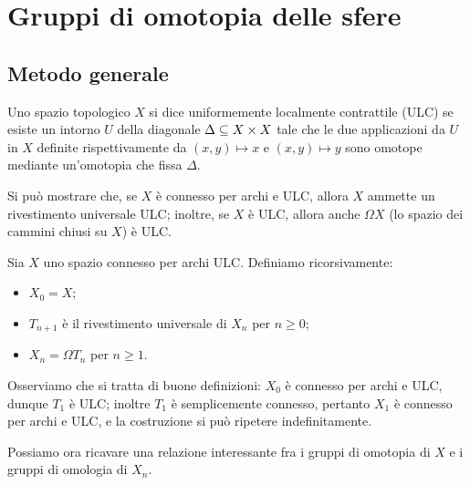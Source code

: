 \chapter{Gruppi di omotopia delle sfere}

\section{Metodo generale}

\begin{definition}
Uno spazio topologico $X$ si dice uniformemente localmente contrattile (ULC) se esiste un intorno $U$ della diagonale $\Delta\subseteq X\times X$ tale che le due applicazioni da $U$ in $X$ definite rispettivamente da $(x,y)\mapsto x$ e $(x,y)\mapsto y$ sono omotope mediante un'omotopia che fissa $\Delta$.
\end{definition}

Si può mostrare che, se $X$ è connesso per archi e ULC, allora $X$ ammette un rivestimento universale ULC; inoltre, se $X$ è ULC, allora anche $\Omega X$ (lo spazio dei cammini chiusi su $X$) è ULC.

Sia $X$ uno spazio connesso per archi ULC. Definiamo ricorsivamente:
\begin{itemize}
\item $X_0=X$;
\item $T_{n+1}$ è il rivestimento universale di $X_n$ per $n\ge 0$;
\item $X_n=\Omega T_n$ per $n\ge 1$.
\end{itemize}
Osserviamo che si tratta di buone definizioni: $X_0$ è connesso per archi e ULC, dunque $T_1$ è ULC; inoltre $T_1$ è semplicemente connesso, pertanto $X_1$ è  connesso per archi e ULC, e la costruzione si può ripetere indefinitamente.

Possiamo ora ricavare una relazione interessante fra i gruppi di omotopia di $X$ e i gruppi di omologia di $X_n$.


